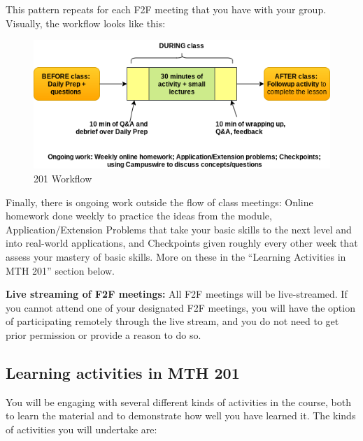 \documentclass[]{article}
\begin{document}
This pattern repeats for each F2F meeting that you have with your group.
Visually, the workflow looks like this:

\begin{figure}
\centering
\includegraphics{201workflow.png}
\caption{201 Workflow}
\end{figure}

Finally, there is ongoing work outside the flow of class meetings:
Online homework done weekly to practice the ideas from the module,
Application/Extension Problems that take your basic skills to the next
level and into real-world applications, and Checkpoints given roughly
every other week that assess your mastery of basic skills. More on these
in the ``Learning Activities in MTH 201'' section below.

\textbf{Live streaming of F2F meetings:} All F2F meetings will be
live-streamed. If you cannot attend one of your designated F2F meetings,
you will have the option of participating remotely through the live
stream, and you do not need to get prior permission or provide a reason
to do so.

\hypertarget{learning-activities-in-mth-201}{%
\subsection{Learning activities in MTH
201}\label{learning-activities-in-mth-201}}

You will be engaging with several different kinds of activities in the
course, both to learn the material and to demonstrate how well you have
learned it. The kinds of activities you will undertake are:
\end{document}
